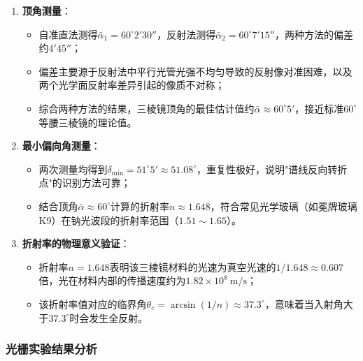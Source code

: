 \documentclass[11pt]{article}
\begin{document}
\begin{enumerate}
    \item \textbf{顶角测量}：
    \begin{itemize}
        \item 自准直法测得$\bar{\alpha}_1 = 60^\circ2'30''$，反射法测得$\bar{\alpha}_2 = 60^\circ7'15''$，两种方法的偏差约$4'45''$；
        \item 偏差主要源于反射法中平行光管光强不均匀导致的反射像对准困难，以及两个光学面反射率差异引起的像质不对称；
        \item 综合两种方法的结果，三棱镜顶角的最佳估计值约$\bar{\alpha} \approx 60^\circ5'$，接近标准$60^\circ$等腰三棱镜的理论值。
    \end{itemize}
    
    \item \textbf{最小偏向角测量}：
    \begin{itemize}
        \item 两次测量均得到$\delta_{\text{min}} = 51^\circ5' \approx 51.08^\circ$，重复性极好，说明"谱线反向转折点"的识别方法可靠；
        \item 结合顶角$\bar{\alpha} \approx 60^\circ$计算的折射率$n \approx 1.648$，符合常见光学玻璃（如冕牌玻璃K9）在钠光波段的折射率范围（$1.51 \sim 1.65$）。
    \end{itemize}
    
    \item \textbf{折射率的物理意义验证}：
    \begin{itemize}
        \item 折射率$n = 1.648$表明该三棱镜材料的光速为真空光速的$1/1.648 \approx 0.607$倍，光在材料内部的传播速度约为$1.82 \times 10^8\ \text{m/s}$；
        \item 该折射率值对应的临界角$\theta_c = \arcsin(1/n) \approx 37.3^\circ$，意味着当入射角大于$37.3^\circ$时会发生全反射。
    \end{itemize}
\end{enumerate}

\subsubsection{光栅实验结果分析}
\end{document}
